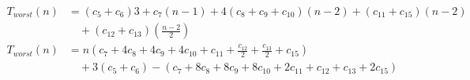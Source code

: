 \begin{subequations}
\label{eq:analyse-checksquare-distance}
\begin{align}
\label{eq:analyse-checksquare-distance-1}
T_{worst}(n)& =
(c_{5} + c_{6})3
+ c_{7}(n-1)
+ 4(c_{8} + c_{9} + c_{10})(n-2)
+ (c_{11} + c_{15})(n-2)
\\
& \quad
+ (c_{12} + c_{13})(\frac{n-2}{2})
\nonumber \\
\label{eq:analyse-checksquare-distance-2}
T_{worst}(n)& =
n(c_{7} + 4c_{8} + 4c_{9} + 4c_{10} + c_{11} + \frac{c_{12}}{2} + \frac{c_{13}}{2} + c_{15})
\\
& \quad
+ 3(c_{5} + c_{6})
- (c_{7} + 8c_{8} + 8c_{9} + 8c_{10} + 2c_{11} + c_{12} + c_{13} + 2c_{15})
\nonumber
\end{align}
\end{subequations}
